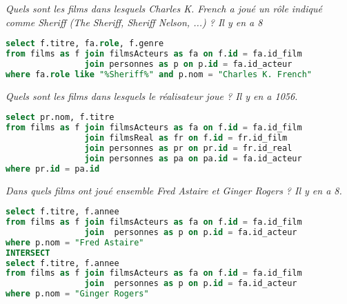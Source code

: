 \begin{Exercise} \it Quels sont les films dans lesquels Charles K. French a joué un rôle indiqué comme Sheriff (The Sheriff, Sheriff Nelson, ...) ? Il y en a 8
\end{Exercise}
\begin{Answer}
\begin{lstlisting}[language=SQL]
select f.titre, fa.role, f.genre
from films as f join filmsActeurs as fa on f.id = fa.id_film
                join personnes as p on p.id = fa.id_acteur
where fa.role like "%Sheriff%" and p.nom = "Charles K. French"
\end{lstlisting}
\end{Answer}
\begin{Exercise} \it Quels sont les films dans lesquels le réalisateur joue ? Il y en a 1056.
\end{Exercise}
\begin{Answer}
\begin{lstlisting}[language=SQL]
select pr.nom, f.titre
from films as f join filmsActeurs as fa on f.id = fa.id_film
                join filmsReal as fr on f.id = fr.id_film
                join personnes as pr on pr.id = fr.id_real
                join personnes as pa on pa.id = fa.id_acteur
where pr.id = pa.id
\end{lstlisting}
\end{Answer}
\begin{Exercise} \it Dans quels films ont joué ensemble Fred Astaire et Ginger Rogers ? Il y en a 8.
\end{Exercise}
\begin{Answer}
\begin{lstlisting}[language=SQL]
select f.titre, f.annee
from films as f join filmsActeurs as fa on f.id = fa.id_film
                join  personnes as p on p.id = fa.id_acteur
where p.nom = "Fred Astaire"
INTERSECT
select f.titre, f.annee
from films as f join filmsActeurs as fa on f.id = fa.id_film
                join  personnes as p on p.id = fa.id_acteur
where p.nom = "Ginger Rogers"
\end{lstlisting}
\end{Answer}
